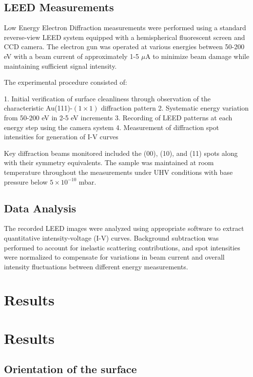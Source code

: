 \documentclass[fontsize=11pt,reqno,a4paper,oneside]{scrartcl}
\begin{document}
\subsection{LEED Measurements}

Low Energy Electron Diffraction measurements were performed using a standard reverse-view LEED system equipped with a hemispherical fluorescent screen and CCD camera. The electron gun was operated at various energies between 50-200 eV with a beam current of approximately 1-5 $\mu$A to minimize beam damage while maintaining sufficient signal intensity.

The experimental procedure consisted of:

1. Initial verification of surface cleanliness through observation of the characteristic Au(111)-$(1 \times 1)$ diffraction pattern
2. Systematic energy variation from 50-200 eV in 2-5 eV increments
3. Recording of LEED patterns at each energy step using the camera system
4. Measurement of diffraction spot intensities for generation of I-V curves

Key diffraction beams monitored included the (00), (10), and (11) spots along with their symmetry equivalents. The sample was maintained at room temperature throughout the measurements under UHV conditions with base pressure below $5 \times 10^{-10}$ mbar.

\subsection{Data Analysis}

The recorded LEED images were analyzed using appropriate software to extract quantitative intensity-voltage (I-V) curves. Background subtraction was performed to account for inelastic scattering contributions, and spot intensities were normalized to compensate for variations in beam current and overall intensity fluctuations between different energy measurements.

\clearpage
\section{Results}

\clearpage
\section{Results}

\subsection{Orientation of the surface}
\end{document}
